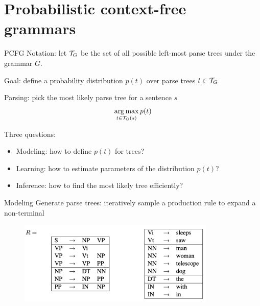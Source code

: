 \documentclass[usenames,dvipsnames,notes]{beamer}
\begin{document}
\section{Probabilistic context-free grammars}

\begin{frame}
    {PCFG}
    Notation: let $\mathcal{T}_G$ be the set of all possible left-most parse trees under the grammar $G$.

    Goal: define a probability distribution $p(t)$ over parse trees $t\in\mathcal{T}_G$

    Parsing: pick the most likely parse tree for a sentence $s$
    $$
    \operatorname*{arg\,max}_{t\in\mathcal{T}_G(s)} p(t)
    $$

    Three questions:\\
    \begin{itemize}
        \item Modeling: how to define $p(t)$ for trees?
        \item Learning: how to estimate parameters of the distribution $p(t)$?
        \item Inference: how to find the most likely tree efficiently?
    \end{itemize}
\end{frame}

\begin{frame}
    {Modeling}
    Generate parse trees: iteratively sample a production rule to expand a non-terminal
    \vspace{-1em}
    \begin{figure}    
        \includegraphics[height=4cm]{figures/toy-cfg-2.png}
    \end{figure}  
    \vspace{7em}
\end{frame}
\end{document}
